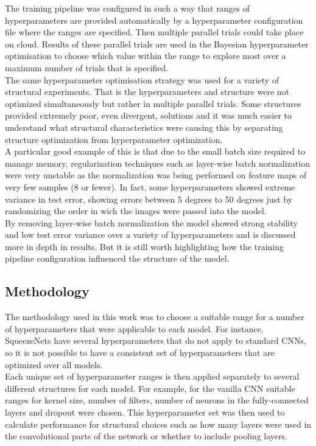 \documentclass{article}
\begin{document}
The training pipeline was configured in such a way that ranges of hyperparameters are provided automatically by a hyperparameter configuration file where the ranges are specified. Then multiple parallel trials could take place on cloud. Results of these parallel trials are used in the Bayesian hyperparameter optimisation to choose which value within the range to explore most over a maximum number of trials that is specified. \\

The same hyperparameter optimisation strategy was used for a variety of structural experiments. That is the hyperparameters and structure were not optimized simultaneously but rather in multiple parallel trials. Some structures provided extremely poor, even divergent, solutions and it was much easier to understand what structural characteristics were causing this by separating structure optimization from hyperparameter optimization.\\

A particular good example of this is that due to the small batch size required to manage memory, regularization techniques such as layer-wise batch normalization were very unstable as the normalization was being performed on feature maps of very few samples (8 or fewer). In fact, some hyperparameters showed extreme variance in test error, showing errors between 5 degrees to 50 degrees just by randomizing the order in wich the images were passed into the model. \\

By removing layer-wise batch normalization the model showed strong stability and low test error variance over a variety of hyperparameters and is discussed more in depth in results.  But it is still worth highlighting how the training pipeline configuration influenced the structure of the model. \\

\subsection*{Methodology}
The methodology used in this work was to choose a suitable range for a number of hyperparameters that were applicable to each model. For instance, SqueezeNets have several hyperparameters that do not apply to standard CNNs, so it is not possible to have a consistent set of hyperparameters that are optimized over all  models. \\

Each unique set of hyperparameter ranges is then applied separately to several different structures for each model. For example, for the vanilla CNN suitable ranges for kernel size, number of filters, number of neurons in the fully-connected layers and dropout were chosen. This hyperparameter set was then used to calculate performance for structural choices such as how many layers were used in the convolutional parts of the network or whether to include pooling layers. \\
\end{document}
